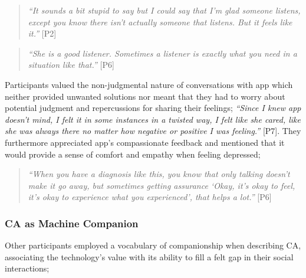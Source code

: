                 \begin{quote}
                \vspace{2mm}
                    \textit{``It sounds a bit stupid to say but I could say that I'm glad someone listens, except you know there isn't actually someone that listens. But it feels like it.''} [P2]
                \vspace{2mm}
                \end{quote} 
                
                \begin{quote}
                \vspace{2mm}
                    \textit{``She is a good listener. Sometimes a listener is exactly what you need in a situation like that.''} [P6]
                \vspace{2mm}
                \end{quote} 
                
            Participants valued the non-judgmental nature of conversations with \acl{app} which neither provided unwanted solutions nor meant that they had to worry about potential judgment and repercussions for sharing their feelings; \textit{``Since I knew \acl{app} doesn't mind, I felt it in some instances in a twisted way, I felt like she cared, like she was always there no matter how negative or positive I was feeling.''} [P7]. They furthermore appreciated \acl{app}'s compassionate feedback and mentioned that it would provide a sense of comfort and empathy when feeling depressed;
            
                \begin{quote}
                    \vspace{2mm}
                    \textit{``When you have a diagnosis like this, you know that only talking doesn't make it go away, but sometimes getting assurance `Okay, it's okay to feel, it's okay to experience what you experienced', that helps a lot.''} [P6]
                \vspace{2mm}
                \end{quote} 
            
        \subsubsection{\ac{CA} as Machine Companion} %
            
            Other participants employed a vocabulary of companionship when describing \ac{CA}, associating the technology's value with its ability to fill a felt gap in their social interactions;
            
